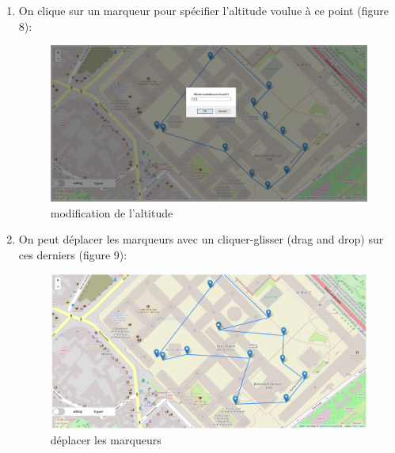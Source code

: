 \documentclass{article}
\begin{document}
\begin{enumerate}
	\item On clique sur un marqueur pour spécifier l'altitude voulue à ce point (figure 8):\\
	\begin{figure}[!h]
 	\begin{center}
 	\includegraphics[scale=0.42]{capt6.PNG}
 	\caption{modification de l'altitude}
 	\end{center}
 	\end{figure}
 	\newpage 
 	
 	\item On peut déplacer les marqueurs avec un cliquer-glisser (drag and drop) sur ces derniers (figure 9):\\
 	\begin{figure}[!h]
 	\begin{center}
 	\includegraphics[scale=0.42]{capt7.PNG}
 	\caption{déplacer les marqueurs}
 	\end{center}
 	\end{figure}
 	

\end{enumerate}
\end{document}
